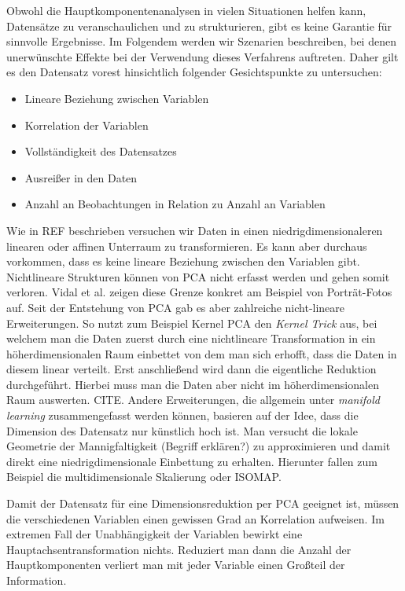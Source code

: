 Obwohl die Hauptkomponentenanalysen in vielen Situationen helfen kann, Datensätze zu veranschaulichen und zu strukturieren, gibt es keine Garantie für sinnvolle Ergebnisse. Im Folgendem werden wir Szenarien beschreiben, bei denen unerwünschte Effekte bei der Verwendung dieses Verfahrens auftreten. Daher gilt es den Datensatz vorest hinsichtlich folgender Gesichtspunkte zu untersuchen: 

\begin{itemize}
\item Lineare Beziehung zwischen Variablen
\item Korrelation der Variablen
\item Vollständigkeit des Datensatzes
\item Ausreißer in den Daten
\item Anzahl an Beobachtungen in Relation zu Anzahl an Variablen
\end{itemize}

Wie in REF beschrieben versuchen wir Daten in einen niedrigdimensionaleren linearen oder affinen Unterraum zu transformieren. Es kann aber durchaus vorkommen, dass es keine lineare Beziehung zwischen den Variablen gibt. Nichtlineare Strukturen können von PCA nicht erfasst werden und gehen somit verloren. \cite{vidal} Vidal et al. zeigen diese Grenze konkret am Beispiel von Porträt-Fotos auf. Seit der Entstehung von PCA gab es aber zahlreiche nicht-lineare Erweiterungen. So nutzt zum Beispiel Kernel PCA den \textit{Kernel Trick} aus, bei welchem man die Daten zuerst durch eine nichtlineare Transformation in ein höherdimensionalen Raum einbettet von dem man sich erhofft, dass die Daten in diesem linear verteilt. Erst anschließend wird dann die eigentliche Reduktion durchgeführt. Hierbei muss man die Daten aber nicht im höherdimensionalen Raum auswerten. CITE. Andere Erweiterungen, die allgemein unter \textit{manifold learning} zusammengefasst werden können, basieren auf der Idee, dass die Dimension des Datensatz nur künstlich hoch ist. Man versucht die lokale Geometrie der Mannigfaltigkeit (Begriff erklären?) zu approximieren und damit direkt eine niedrigdimensionale Einbettung zu erhalten. Hierunter fallen zum Beispiel die multidimensionale Skalierung oder ISOMAP.

Damit der Datensatz für eine Dimensionsreduktion per PCA geeignet ist, müssen die verschiedenen Variablen einen gewissen Grad an Korrelation aufweisen. Im extremen Fall der Unabhängigkeit der Variablen bewirkt eine Hauptachsentransformation nichts. Reduziert man dann die Anzahl der Hauptkomponenten verliert man mit jeder Variable einen Großteil der Information.


